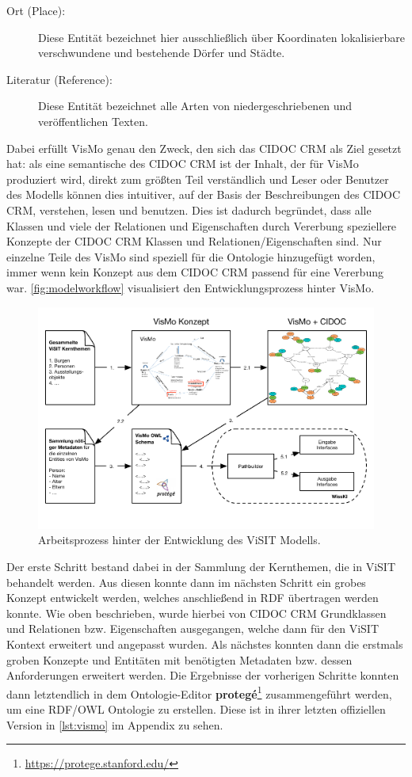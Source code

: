 \begin{description}
	\item[Ort (Place):] Diese Entität bezeichnet hier ausschließlich über Koordinaten lokalisierbare verschwundene und bestehende Dörfer und Städte.
	\item[Literatur (Reference):] Diese Entität bezeichnet alle Arten von niedergeschriebenen und veröffentlichen Texten.
\end{description}

Dabei erfüllt VisMo genau den Zweck, den sich das CIDOC CRM als Ziel gesetzt hat: als eine semantische  des CIDOC CRM ist der Inhalt, der für VisMo produziert wird, direkt zum größten Teil verständlich und Leser oder Benutzer des Modells können dies intuitiver, auf der Basis der Beschreibungen des CIDOC CRM, verstehen, lesen und benutzen. Dies ist dadurch begründet, dass alle Klassen und viele der Relationen und Eigenschaften durch Vererbung speziellere Konzepte der CIDOC CRM Klassen und Relationen/Eigenschaften sind. Nur einzelne Teile des VisMo sind speziell für die Ontologie hinzugefügt worden, immer wenn kein Konzept aus dem CIDOC CRM passend für eine Vererbung war. \autoref{fig:modelworkflow} visualisiert den Entwicklungsprozess hinter VisMo.

\begin{figure}[htb]
    \centering
    \includegraphics[width=\textwidth]{Figures/berndl/modelworkflow}
    \caption{\label{fig:modelworkflow} Arbeitsprozess hinter der Entwicklung des ViSIT Modells.}
\end{figure}

Der erste Schritt bestand dabei in der Sammlung der Kernthemen, die in ViSIT behandelt werden. Aus diesen konnte dann im nächsten Schritt ein grobes Konzept entwickelt werden, welches anschließend in RDF übertragen werden konnte. Wie oben beschrieben, wurde hierbei von CIDOC CRM Grundklassen und Relationen bzw. Eigenschaften ausgegangen, welche dann für den ViSIT Kontext erweitert und angepasst wurden. Als nächstes konnten dann die erstmals groben Konzepte und Entitäten mit benötigten Metadaten bzw. dessen Anforderungen erweitert werden. Die Ergebnisse der vorherigen Schritte konnten dann letztendlich in dem Ontologie-Editor \textbf{protegé}\footnote{\url{https://protege.stanford.edu/}} zusammengeführt werden, um eine RDF/OWL Ontologie zu erstellen. Diese ist in ihrer letzten offiziellen Version in \autoref{lst:vismo} im Appendix zu sehen.

